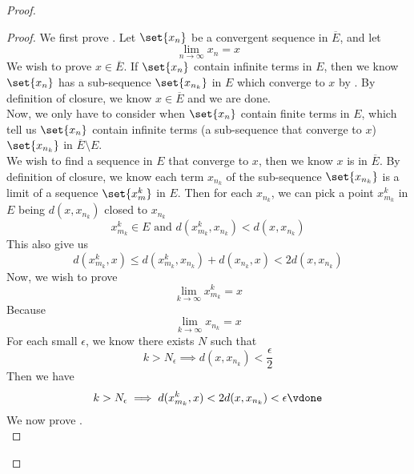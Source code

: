 \documentclass{report}
\begin{document}
\begin{proof}
\begin{proof}
We first prove . Let $\set{x_n}$ be a convergent sequence in $\overline{E}$, and let
\begin{equation*}
\lim_{n\to\infty} x_n=x
\end{equation*}
We wish to prove $x\in \overline{E}$. If $\set{x_n}$ contain infinite terms in $E$, then we know $\set{x_n}$ has a sub-sequence $\set{x_{n_k}}$ in $E$ which converge to $x$ by  . By definition of closure, we know $x\in \overline{E}$ and we are done.\\

Now, we only have to consider when $\set{x_n}$ contain finite terms in $E$, which tell us $\set{x_n}$ contain infinite terms (a sub-sequence that converge to $x$) $\set{x_{n_k}}$ in $\overline{E}\setminus E$.\\

We wish to find a sequence in $E$ that converge to  $x$, then we know  $x$ is in $\overline{E}$. By definition of closure, we know each term $x_{n_k}$ of the sub-sequence $\set{x_{n_k}}$ is a limit of a sequence $\set{x^k_m}$ in $E$. Then for each $x_{n_k}$, we can pick a point $x^k_{m_k}$ in $E$ being $d(x,x_{n_k})$ closed to $x_{n_k}$ 
\begin{equation*}
x_{m_k}^k\in E\text{ and }d(x^k_{m_k},x_{n_k})<d(x,x_{n_k})
\end{equation*}
This also give us
\begin{equation*}
d(x_{m_k}^k,x)\leq d(x_{m_k}^k,x_{n_k})+d(x_{n_k},x)<2d(x,x_{n_k})
\end{equation*}
Now, we wish to prove 
\begin{equation*}
\lim_{k\to\infty}x^k_{m_k}=x
\end{equation*}
Because
\begin{equation*}
\lim_{k\to\infty}x_{n_k}=x
\end{equation*}
For each small $\epsilon $, we know there exists $N$ such that
\begin{equation*}
k>N_\epsilon \implies d(x,x_{n_k})<\frac{\epsilon}{2} 
\end{equation*}
Then we have
\begin{equation*}
k>N_\epsilon \implies d(x^k_{m_k},x)<2d(x,x_{n_k})<\epsilon \vdone
\end{equation*}
We now prove .\\ 


\end{proof}
\end{proof}
\end{document}
